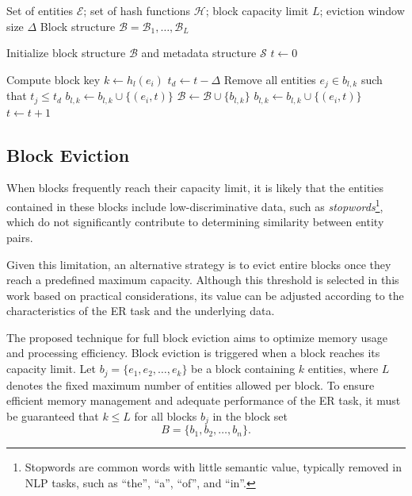 \documentclass{ieeeaccess}
\begin{document}
\begin{algorithm}[H]
\caption{Time-aware entity eviction}
\label{alg:blocking_array_simplified}
\begin{algorithmic}[1]

\Require Set of entities $\mathcal{E}$; set of hash functions $\mathcal{H}$; block capacity limit $L$; eviction window size $\Delta$
\Ensure Block structure $\mathcal{B} = {\mathcal{B}_1, \dots, \mathcal{B}_L}$

\State Initialize block structure $\mathcal{B}$ and metadata structure $\mathcal{S}$ 
\State $t \gets 0$ 

\State Compute block key $k \gets h_l(e_i)$
            \State $t_d \gets t - \Delta$ 
            \State Remove all entities $e_j \in b_{l,k}$ such that $t_j \leq t_d$
        \EndIf
        \State $b_{l,k} \gets b_{l,k} \cup \{(e_i,t)\}$
    \Else
        \State $\mathcal{B} \gets \mathcal{B} \cup \{b_{l,k}\}$
        \State $b_{l,k} \gets b_{l,k} \cup \{(e_i,t)\}$
    \EndIf
\EndFor
\State $t \gets t + 1$
\EndFor
\end{algorithmic}
\end{algorithm}

\subsection{Block Eviction} \label{subsec:descarte-blocos}

When blocks frequently reach their capacity limit, it is likely that the entities contained in these blocks include low-discriminative data, such as \textit{stopwords}\footnote{Stopwords are common words with little semantic value, typically removed in NLP tasks, such as ``the'', ``a'', ``of'', and ``in''.}, which do not significantly contribute to determining similarity between entity pairs.

Given this limitation, an alternative strategy is to evict entire blocks once they reach a predefined maximum capacity. Although this threshold is selected in this work based on practical considerations, its value can be adjusted according to the characteristics of the ER task and the underlying data.

The proposed technique for full block eviction aims to optimize memory usage and processing efficiency. Block eviction is triggered when a block reaches its capacity limit. Let \( b_j = \{ e_1, e_2, \dots, e_k \} \) be a block containing \( k \) entities, where \( L \) denotes the fixed maximum number of entities allowed per block. To ensure efficient memory management and adequate performance of the ER task, it must be guaranteed that \( k \leq L \) for all blocks \( b_j \) in the block set \[B = \{ b_1, b_2, \dots, b_n \}.\]
\end{document}
